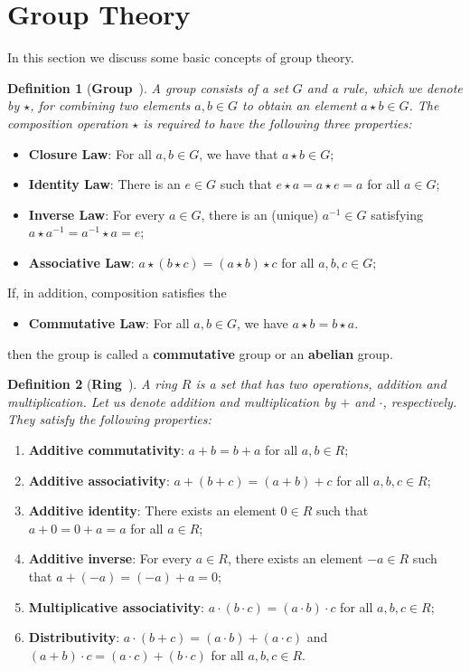 \documentclass[binding=0.6cm,oneside,noexaminfo]{sapthesis}
\newtheorem{definition}{Definition}
\begin{document}
\section{Group Theory}
\label{groupth}
In this section we discuss some basic concepts of group theory.
\begin{definition}[\textbf{Group}~\cite{Hoffstein2008Cryptography}]
  A group consists of a set $G$ and a rule, which we denote by $\star$,
  for combining two elements $a, b \in G$ to obtain an element $a \star b \in G$. The
  composition operation $\star$ is required to have the following three properties:
\end{definition}
\begin{itemize}
  \item \textbf{Closure Law}: For all $a,b \in G$, we have that $a\star b \in G$;
  \item \textbf{Identity Law}: There is an $e \in G$ such that 
  $e \star a = a \star e = a$ for all $a \in G$;
  \item \textbf{Inverse Law}: For every $a \in G$, there is an (unique)
  $a^{-1} \in G$ satisfying $a \star a^{-1} = a^{-1} \star a = e$;
  \item \textbf{Associative Law}: $a \star (b \star c) = (a \star b) \star c$ for all $a, b, c \in G$;
\end{itemize}
If, in addition, composition satisfies the
\begin{itemize}
    \item \textbf{Commutative Law}: For all $a, b \in G$, we have $a \star b = b \star a$.
\end{itemize}
then  the group is called a \textbf{commutative} group or an \textbf{abelian} group.

\begin{definition}[\textbf{Ring}~\cite{Huang2025GroupTheory}]
  A ring $R$ is a set that has two operations, addition and multiplication. 
  Let us denote addition and multiplication by $+$ and $\cdot$, respectively. 
  They satisfy the following properties:
\end{definition}
\begin{enumerate}
  \item \textbf{Additive commutativity}: $a + b = b + a$ for all $a, b \in R$;
  \item \textbf{Additive associativity}: $a + (b + c) = (a + b) + c$ for all $a, b, c \in R$;
  \item \textbf{Additive identity}: There exists an element $0 \in R$ such that $a + 0 = 0 + a = a$ for all $a \in R$;
  \item \textbf{Additive inverse}: For every $a \in R$, there exists an element $-a \in R$ such that $a + (-a) = (-a) + a = 0$;
  \item \textbf{Multiplicative associativity}: $a \cdot (b \cdot c) = (a \cdot b) \cdot c$ for all $a, b, c \in R$;
  \item \textbf{Distributivity}: $a \cdot (b + c) = (a \cdot b) + (a \cdot c)$ and $(a + b) \cdot c = (a \cdot c) + (b \cdot c)$ for all $a, b, c \in R$.
\end{enumerate}
\end{document}
